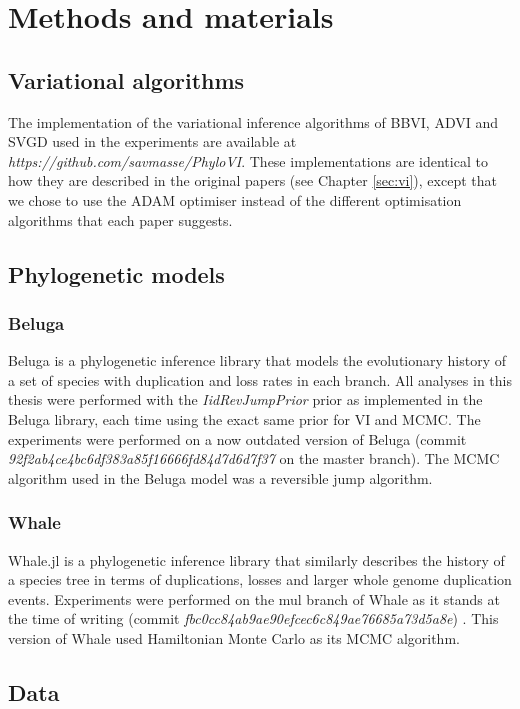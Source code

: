 
\chapter{Methods and materials}

\section{Variational algorithms}
The implementation of the variational inference algorithms of BBVI, ADVI and SVGD used in the experiments are available at \textit{https://github.com/savmasse/PhyloVI}. These implementations are identical to how they are described in the original papers (see Chapter \ref{sec:vi}), except that we chose to use the ADAM optimiser instead of the different optimisation algorithms that each paper suggests.

\section{Phylogenetic models}


\subsection{Beluga \parencite{beluga}}
Beluga is a phylogenetic inference library that models the evolutionary history of a set of species with duplication and loss rates in each branch. All analyses in this thesis were performed with the  \textit{IidRevJumpPrior} prior as implemented in the Beluga library, each time using the exact same prior for VI and MCMC. The experiments were performed on a now outdated version of Beluga (commit \textit{92f2ab4ce4bc6df383a85f16666fd84d7d6d7f37} on the master branch). The MCMC algorithm used in the Beluga model was a reversible jump algorithm.
 
\subsection{Whale \parencite{whale}}
Whale.jl is a phylogenetic inference library that similarly describes the history of a species tree in terms of duplications, losses and larger whole genome duplication events. Experiments were performed on the mul branch of Whale as it stands at the time of writing (commit \textit{fbc0cc84ab9ae90efcec6c849ae76685a73d5a8e}) . This version of Whale used Hamiltonian Monte Carlo as its MCMC algorithm.


\section{Data}


